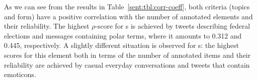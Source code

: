 As we can see from the results in Table~\ref{sent:tbl:corr-coeff},
both criteria (topics and form) have a positive correlation with the
number of annotated elements and their reliability.  The highest
$\rho$-score for s is achieved by tweets
describing federal elections and messages containing polar terms,
where it amounts to 0.312 and 0.445, respectively.  A slightly
different situation is observed for s: the
highest scores for this element both in terms of the number of
annotated items and their reliability are achieved by casual everyday
conversations and tweets that contain emoticons.




